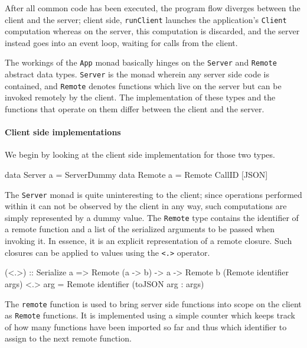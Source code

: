 \documentclass[preprint]{sigplanconf}
\begin{document}
After all common code has been executed, the program flow diverges between the
client and the server; client side, \lstinline!runClient! launches the
application's \lstinline!Client! computation whereas on the server, this
computation is discarded, and the server instead goes into an event loop,
waiting for calls from the client.

The workings of the \lstinline!App! monad basically hinges on the
\lstinline!Server! and \lstinline!Remote! abstract data types.
\lstinline!Server! is the monad wherein any server side code is contained, and
\lstinline!Remote! denotes functions which live on the server but can
be invoked remotely by the client. The implementation of these types and the
functions that operate on them differ between the client and the server.

\paragraph{Client side implementations}
We begin by looking at the client side implementation for those two types.

\begin{code}
data Server a = ServerDummy
data Remote a = Remote CallID [JSON]
\end{code}

The \lstinline!Server! monad is quite uninteresting to the client; since
operations performed within it can not be observed by the client in any way,
such computations are simply represented by a dummy value.
The \lstinline!Remote! type contains the identifier of a remote function and a
list of the serialized arguments to be passed when invoking it. In essence,
it is an explicit representation of a remote closure. Such closures can be
applied to values using the \lstinline!<.>! operator.

\begin{code}
(<.>) :: Serialize a
      => Remote (a -> b) -> a -> Remote b
(Remote identifier args) <.> arg =
  Remote identifier (toJSON arg : args)
\end{code}

The \lstinline!remote! function is used to bring server side functions into
scope on the client as \lstinline!Remote! functions. It is implemented using a
simple counter which keeps track of how many functions have been imported so
far and thus which identifier to assign to the next remote function.

\end{document}
